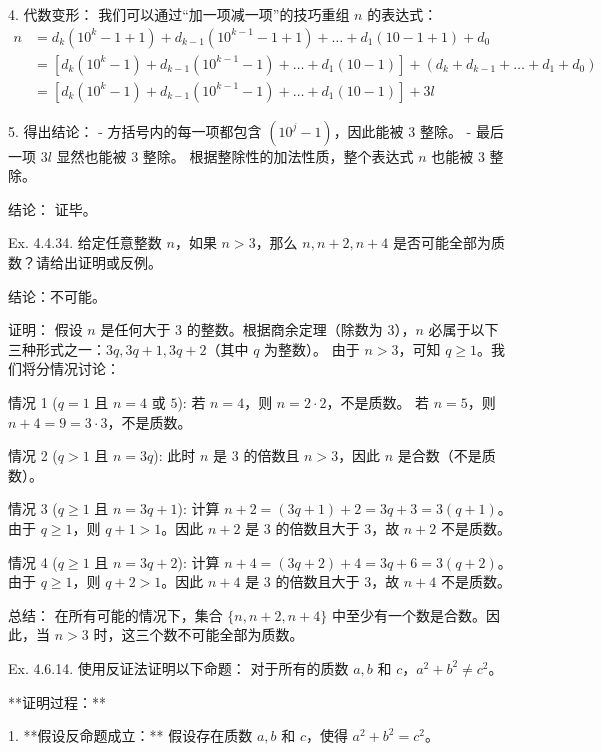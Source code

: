\begin{questions}
\begin{solution}
4. 代数变形：
   我们可以通过“加一项减一项”的技巧重组 $n$ 的表达式：
   \begin{align}
   n &= d_k(10^k - 1 + 1) + d_{k-1}(10^{k-1} - 1 + 1) + \dots + d_1(10 - 1 + 1) + d_0 \\
   &= [d_k(10^k - 1) + d_{k-1}(10^{k-1} - 1) + \dots + d_1(10 - 1)] + (d_k + d_{k-1} + \dots + d_1 + d_0) \\
   &= [d_k(10^k - 1) + d_{k-1}(10^{k-1} - 1) + \dots + d_1(10 - 1)] + 3l
   \end{align}

5. 得出结论：
   - 方括号内的每一项都包含 $(10^j - 1)$，因此能被 3 整除。
   - 最后一项 $3l$ 显然也能被 3 整除。
   根据整除性的加法性质，整个表达式 $n$ 也能被 3 整除。

结论： 证毕。
\end{solution}

\question
Ex. 4.4.34. 给定任意整数 $n$，如果 $n > 3$，那么 $n, n + 2, n + 4$ 是否可能全部为质数？请给出证明或反例。

\begin{solution}
结论：不可能。

证明：
假设 $n$ 是任何大于 3 的整数。根据商余定理（除数为 3），$n$ 必属于以下三种形式之一：$3q, 3q+1, 3q+2$（其中 $q$ 为整数）。
由于 $n > 3$，可知 $q \ge 1$。我们将分情况讨论：

 情况 1 ($q = 1$ 且 $n = 4$ 或 $5$):
     若 $n = 4$，则 $n = 2 \cdot 2$，不是质数。
     若 $n = 5$，则 $n+4 = 9 = 3 \cdot 3$，不是质数。

 情况 2 ($q > 1$ 且 $n = 3q$):
     此时 $n$ 是 3 的倍数且 $n > 3$，因此 $n$ 是合数（不是质数）。

 情况 3 ($q \ge 1$ 且 $n = 3q + 1$):
     计算 $n + 2 = (3q + 1) + 2 = 3q + 3 = 3(q + 1)$。
     由于 $q \ge 1$，则 $q+1 > 1$。因此 $n+2$ 是 3 的倍数且大于 3，故 $n+2$ 不是质数。

 情况 4 ($q \ge 1$ 且 $n = 3q + 2$):
     计算 $n + 4 = (3q + 2) + 4 = 3q + 6 = 3(q + 2)$。
     由于 $q \ge 1$，则 $q+2 > 1$。因此 $n+4$ 是 3 的倍数且大于 3，故 $n+4$ 不是质数。

总结：
在所有可能的情况下，集合 $\{n, n+2, n+4\}$ 中至少有一个数是合数。因此，当 $n > 3$ 时，这三个数不可能全部为质数。
\end{solution}
\question
Ex. 4.6.14. 使用反证法证明以下命题：
对于所有的质数 $a, b$ 和 $c$，$a^2 + b^2 \neq c^2$。

\begin{solution}
**证明过程：**

1. **假设反命题成立：**
   假设存在质数 $a, b$ 和 $c$，使得 $a^2 + b^2 = c^2$。


\end{solution}
\end{questions}
